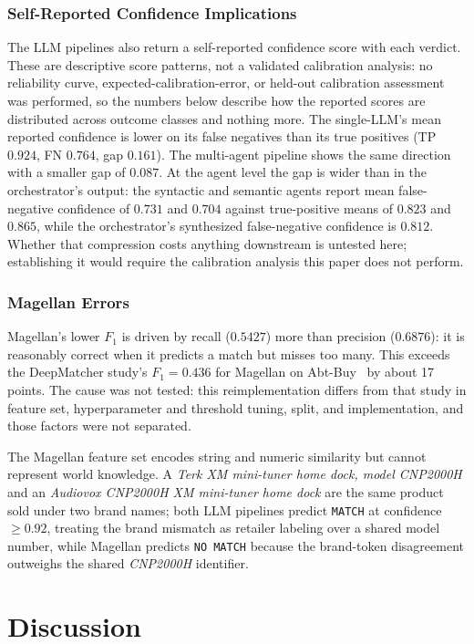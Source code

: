 \documentclass[sigconf]{acmart}
\begin{document}
\subsubsection{Self-Reported Confidence Implications}
The LLM pipelines also return a self-reported confidence score with each verdict.
These are descriptive score patterns, not a validated calibration analysis: no reliability curve, expected-calibration-error, or held-out calibration assessment was performed, so the numbers below describe how the reported scores are distributed across outcome classes and nothing more.
The single-LLM's mean reported confidence is lower on its false negatives than its true positives (TP $0.924$, FN $0.764$, gap $0.161$).
The multi-agent pipeline shows the same direction with a smaller gap of $0.087$.
At the agent level the gap is wider than in the orchestrator's output: the syntactic and semantic agents report mean false-negative confidence of $0.731$ and $0.704$ against true-positive means of $0.823$ and $0.865$, while the orchestrator's synthesized false-negative confidence is $0.812$.
Whether that compression costs anything downstream is untested here; establishing it would require the calibration analysis this paper does not perform.

\subsubsection{Magellan Errors}
Magellan's lower $F_1$ is driven by recall ($0.5427$) more than precision ($0.6876$): it is reasonably correct when it predicts a match but misses too many.
This exceeds the DeepMatcher study's $F_1 = 0.436$ for Magellan on Abt-Buy~\cite{mudgal2018deep} by about 17 points.
The cause was not tested: this reimplementation differs from that study in feature set, hyperparameter and threshold tuning, split, and implementation, and those factors were not separated.

The Magellan feature set encodes string and numeric similarity but cannot represent world knowledge.
A \textit{Terk XM mini-tuner home dock, model CNP2000H} and an \textit{Audiovox CNP2000H XM mini-tuner home dock} are the same product sold under two brand names; both LLM pipelines predict \texttt{MATCH} at confidence $\ge 0.92$, treating the brand mismatch as retailer labeling over a shared model number, while Magellan predicts \texttt{NO MATCH} because the brand-token disagreement outweighs the shared \textit{CNP2000H} identifier.


\section{Discussion}
\label{sec:discussion}
\end{document}
